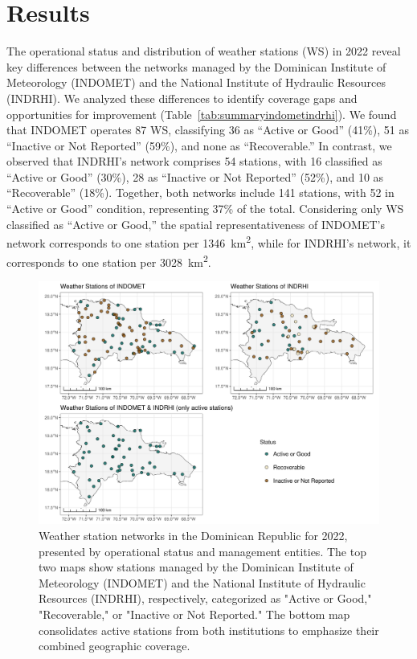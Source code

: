 \documentclass[spanish]{article}
\begin{document}
\hypertarget{results}{%
\section{Results}\label{results}}

The operational status and distribution of weather stations (WS) in 2022
reveal key differences between the networks managed by the Dominican
Institute of Meteorology (INDOMET) and the National Institute of
Hydraulic Resources (INDRHI). We analyzed these differences to identify
coverage gaps and opportunities for improvement
(Table~\ref{tab:summaryindometindrhi}). We found that INDOMET operates
87 WS, classifying 36 as ``Active or Good'' (41\%), 51 as ``Inactive or
Not Reported'' (59\%), and none as ``Recoverable.'' In contrast, we
observed that INDRHI's network comprises 54 stations, with 16 classified
as ``Active or Good'' (30\%), 28 as ``Inactive or Not Reported'' (52\%),
and 10 as ``Recoverable'' (18\%). Together, both networks include 141
stations, with 52 in ``Active or Good'' condition, representing 37\% of
the total. Considering only WS classified as ``Active or Good,'' the
spatial representativeness of INDOMET's network corresponds to one
station per 1346~km\textsuperscript{2}, while for INDRHI's network, it
corresponds to one station per 3028~km\textsuperscript{2}.

\begin{figure}[!ht]

{\centering \includegraphics[width=1\linewidth]{figuras/ws_network_2022_grid2} 

}

\caption{Weather station networks in the Dominican Republic for 2022, presented by operational status and management entities. The top two maps show stations managed by the Dominican Institute of Meteorology (INDOMET) and the National Institute of Hydraulic Resources (INDRHI), respectively, categorized as "Active or Good," "Recoverable," or "Inactive or Not Reported." The bottom map consolidates active stations from both institutions to emphasize their combined geographic coverage.}\label{fig:ws_network_2022_grid2}
\end{figure}
\end{document}
